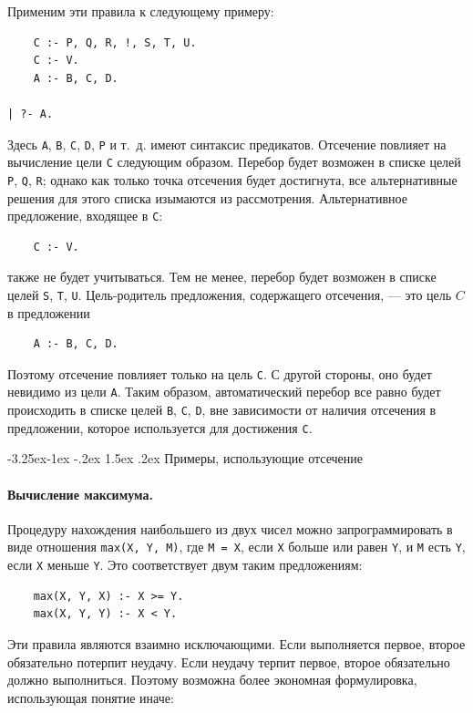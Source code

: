 \documentclass[12pt, openany, twoside]{book} %
\makeatletter
\renewcommand\subsection{\@startsection{subsection}{2}{\z@}%
                                     {-3.25ex\@plus -1ex \@minus -.2ex}%
                                     {1.5ex \@plus .2ex}%
                                     {\normalfont\normalsize\bfseries}}
\makeatother
\begin{document}
Применим эти правила к следующему примеру:
{\tt \begin{verbatim}
    С :- Р, Q, R, !, S, Т, U.
    С :- V.
    А :- В, С, D.

| ?- А.
\end{verbatim}}

Здесь {\tt А}, {\tt В}, {\tt С}, {\tt D}, {\tt P} и т.~д. имеют синтаксис предикатов. Отсечение повлияет на вычисление цели {\tt С} следующим образом. Перебор будет возможен в списке целей {\tt Р}, {\tt Q}, {\tt R}; однако как только точка отсечения будет достигнута, все альтернативные решения для этого списка изымаются из рассмотрения. Альтернативное предложение, входящее в {\tt С}:
{\tt \begin{verbatim}
    С :- V.
\end{verbatim}}
\noindent также не будет учитываться. Тем не менее, перебор будет возможен в списке целей {\tt S}, {\tt T}, {\tt U}. Цель-родитель предложения, содержащего отсечения, --- это цель $C$ в предложении
{\tt \begin{verbatim}
    А :- В, С, D.
\end{verbatim}}

Поэтому отсечение повлияет только на цель {\tt С}. С другой стороны, оно будет невидимо из цели {\tt А}. Таким образом, автоматический перебор все равно будет происходить в списке целей {\tt В}, {\tt С}, {\tt D}, вне зависимости от наличия отсечения в предложении, которое используется для достижения {\tt С}.

\subsection{Примеры, использующие отсечение}
\paragraph{Вычисление максимума.}
Процедуру нахождения наибольшего из двух чисел можно запрограммировать в виде отношения {\tt max(X, Y, М)}, где {\tt М = X}, если {\tt X} больше или равен {\tt Y}, и {\tt М} есть {\tt Y}, если {\tt X} меньше {\tt Y}. Это соответствует двум таким предложениям:

{\tt \begin{verbatim}
    max(X, Y, X) :- X >= Y.
    max(X, Y, Y) :- X < Y.
\end{verbatim}}

Эти правила являются взаимно исключающими. Если выполняется первое, второе обязательно потерпит неудачу. Если неудачу терпит первое, второе обязательно должно выполниться. Поэтому возможна более экономная формулировка, использующая понятие иначе:
\end{document}
